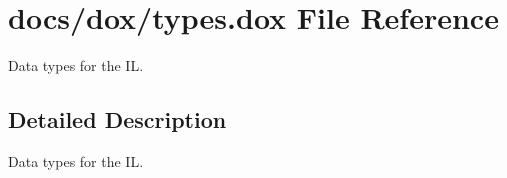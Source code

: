 \hypertarget{types_8dox}{\section{docs/dox/types.dox File Reference}
\label{types_8dox}
}


Data types for the I\+L.  




\subsection{Detailed Description}
Data types for the I\+L. 

